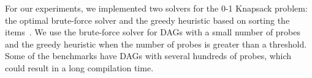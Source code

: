 



For our experiments, we implemented two solvers for the 0-1 Knapsack problem:
the optimal brute-force solver and
the greedy heuristic based on sorting the items~\citep{dantzig57}.
We use the brute-force solver for DAGs with a small number of probes and the
greedy heuristic when the number of probes is greater than a threshold.
Some of the benchmarks have DAGs with several hundreds of probes, which could
result in a long compilation time.

